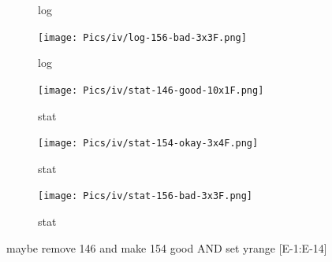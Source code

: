 \begin{figure}
\begin{subfigure}{.3\textwidth}
        \caption{log} \label{fig:log2}
    \end{subfigure}
    \begin{subfigure}{.3\textwidth}
        \texttt{[image: Pics/iv/log-156-bad-3x3F.png]}
        \caption{log} \label{fig:log3}
    \end{subfigure}
    \begin{subfigure}{.3\textwidth}
        \texttt{[image: Pics/iv/stat-146-good-10x1F.png]}
        \caption{stat} \label{fig:stat1}
    \end{subfigure}
    \begin{subfigure}{.3\textwidth}
        \texttt{[image: Pics/iv/stat-154-okay-3x4F.png]}
        \caption{stat} \label{fig:stat2}
    \end{subfigure}
    \begin{subfigure}{.3\textwidth}
        \texttt{[image: Pics/iv/stat-156-bad-3x3F.png]}
        \caption{stat} \label{fig:stat3}
    \end{subfigure}
    \caption{maybe remove 146 and make 154 good AND set yrange [E-1:E-14]} \label{fig:sem}
\end{figure}



